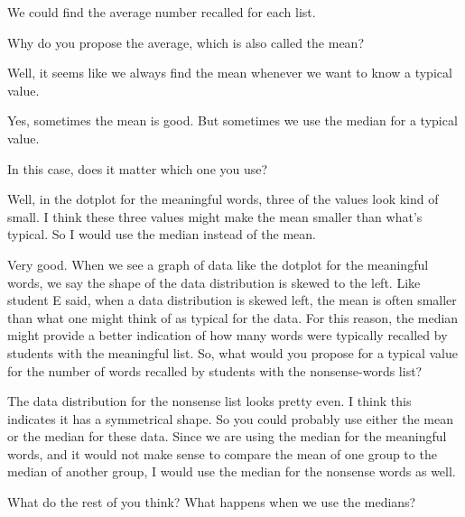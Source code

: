 {\begin{scriptlist}
      \item [Student D:] We could find the average number recalled for each list.
      
      \item [Teacher:] Why do you propose the average, which is also called the mean?
      
      \item [Student D:] Well, it seems like we always find the mean whenever we want to know a typical value.
  
      \item [Student E:] Yes, sometimes the mean is good. But sometimes we use the median for a typical value.\vspace{\baselineskip}
      
      \item [Teacher:] In this case, does it matter which one you use?\vspace{\baselineskip}
      
      \item [Student E:] Well, in the dotplot for the meaningful words, three of the values look kind of small. I think these three values might make the mean smaller than what's typical. So I would use the median instead of the mean.
      
      \item [Teacher:] Very good. When we see a graph of data like the dotplot for the meaningful words, we say the shape of the data distribution is skewed to the left. Like student E said, when a data distribution is skewed left, the mean is often smaller than what one might think of as typical for the data. For this reason, the median might provide a better indication of how many words were typically recalled by students with the meaningful list. So, what would you propose for a typical value for the number of words recalled by students with the nonsense-words list?
      
      \item [Student E:] The data distribution for the nonsense list looks pretty even. I think this indicates it has a symmetrical shape. So you could probably use either the mean or the median for these data. Since we are using the median for the meaningful words, and it would not make sense to compare the mean of one group to the median of another group, I would use the median for the nonsense words as well.
      
      \item [Teacher:] What do the rest of you think? What happens when we use the medians?
      

\end{scriptlist}}
